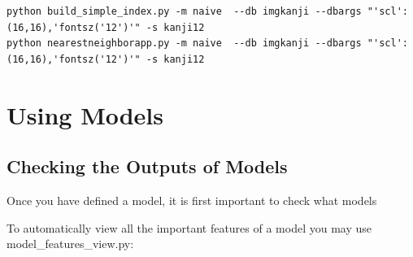 \documentclass{report}
\begin{document}
\begin{lstlisting}
python build_simple_index.py -m naive  --db imgkanji --dbargs "'scl':(16,16),'fontsz('12')'" -s kanji12
python nearestneighborapp.py -m naive  --db imgkanji --dbargs "'scl':(16,16),'fontsz('12')'" -s kanji12

\end{lstlisting}





\section{Using Models}
\subsection{Checking the Outputs of Models}
Once you have defined a model, it is first important to check  what models

To automatically view all the important features of a model you may use model\_features\_view.py:
\end{document}
